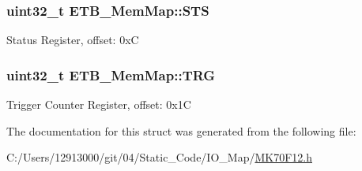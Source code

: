 \subsubsection[{S\+T\+S}]{\setlength{\rightskip}{0pt plus 5cm}uint32\+\_\+t E\+T\+B\+\_\+\+Mem\+Map\+::\+S\+T\+S}\label{struct_e_t_b___mem_map_a5a471e968aca953fb748c16b10d56939}
Status Register, offset\+: 0x\+C \hypertarget{struct_e_t_b___mem_map_a96dc184cb9f6ea6ba7b299b05c58d4ed}{}
\subsubsection[{T\+R\+G}]{\setlength{\rightskip}{0pt plus 5cm}uint32\+\_\+t E\+T\+B\+\_\+\+Mem\+Map\+::\+T\+R\+G}\label{struct_e_t_b___mem_map_a96dc184cb9f6ea6ba7b299b05c58d4ed}
Trigger Counter Register, offset\+: 0x1\+C 

The documentation for this struct was generated from the following file\+:\begin{DoxyCompactItemize}
\item 
C\+:/\+Users/12913000/git/04/\+Static\+\_\+\+Code/\+I\+O\+\_\+\+Map/\hyperlink{_m_k70_f12_8h}{M\+K70\+F12.\+h}\end{DoxyCompactItemize}
